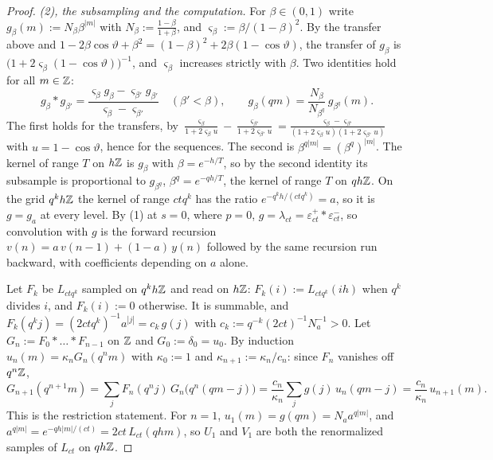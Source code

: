 \begin{proof}
\emph{(2), the subsampling and the computation.} For $\beta \in (0,1)$ write
$g_\beta(m) := N_\beta\beta^{|m|}$ with $N_\beta := \tfrac{1-\beta}{1+\beta}$, and
$\varsigma_\beta := \beta/(1-\beta)^2$. By the transfer above and
$1 - 2\beta\cos\vartheta + \beta^2 = (1-\beta)^2 + 2\beta(1 - \cos\vartheta)$, the transfer of
$g_\beta$ is $\bigl(1 + 2\varsigma_\beta(1 - \cos\vartheta)\bigr)^{-1}$, and $\varsigma_\beta$
increases strictly with $\beta$. Two identities hold for all $m \in \mathbb{Z}$:
\[
  g_\beta * g_{\beta'} = \frac{\varsigma_\beta g_\beta - \varsigma_{\beta'}g_{\beta'}}
  {\varsigma_\beta - \varsigma_{\beta'}} \quad (\beta' < \beta), \qquad
  g_\beta(qm) = \frac{N_\beta}{N_{\beta^q}}\,g_{\beta^q}(m) .
\]
The first holds for the transfers, by
$\frac{\varsigma_\beta}{1 + 2\varsigma_\beta u} - \frac{\varsigma_{\beta'}}{1 + 2\varsigma_{\beta'}u}
= \frac{\varsigma_\beta - \varsigma_{\beta'}}{(1 + 2\varsigma_\beta u)(1 + 2\varsigma_{\beta'}u)}$
with $u = 1 - \cos\vartheta$, hence for the sequences. The second is
$\beta^{q|m|} = (\beta^q)^{|m|}$. The kernel of range $T$ on $h\mathbb{Z}$ is $g_\beta$ with
$\beta = e^{-h/T}$, so by the second identity its subsample is proportional to
$g_{\beta^q}$, $\beta^q = e^{-qh/T}$, the kernel of range $T$ on $qh\mathbb{Z}$. On the grid $q^kh\mathbb{Z}$ the
kernel of range $ctq^k$ has the ratio $e^{-q^kh/(ctq^k)} = a$, so it is $g = g_a$ at every level.
By (1) at $s = 0$, where $p = 0$, $g = \lambda_{ct} = \varepsilon^+_{ct} * \varepsilon^-_{ct}$, so
convolution with $g$ is the forward recursion $v(n) = a\,v(n-1) + (1 - a)\,y(n)$ followed by the
same recursion run backward, with coefficients depending on $a$ alone.

Let $F_k$ be $L_{ctq^k}$ sampled on $q^kh\mathbb{Z}$ and read on $h\mathbb{Z}$: $F_k(i) := L_{ctq^k}(ih)$ when
$q^k$ divides $i$, and $F_k(i) := 0$ otherwise. It is summable, and
$F_k(q^kj) = (2ctq^k)^{-1}a^{|j|} = c_k\,g(j)$ with $c_k := q^{-k}(2ct)^{-1}N_a^{-1} > 0$. Let
$G_n := F_0 * \dots * F_{n-1}$ on $\mathbb{Z}$ and $G_0 := \delta_0 = u_0$. By induction
$u_n(m) = \kappa_nG_n(q^nm)$ with $\kappa_0 := 1$ and $\kappa_{n+1} := \kappa_n/c_n$: since $F_n$
vanishes off $q^n\mathbb{Z}$,
\[
  G_{n+1}(q^{n+1}m) = \sum_jF_n(q^nj)\,G_n\bigl(q^n(qm - j)\bigr)
  = \frac{c_n}{\kappa_n}\sum_jg(j)\,u_n(qm - j) = \frac{c_n}{\kappa_n}\,u_{n+1}(m) .
\]
This is the restriction statement. For $n = 1$, $u_1(m) = g(qm) = N_aa^{q|m|}$, and
$a^{q|m|} = e^{-qh|m|/(ct)} = 2ct\,L_{ct}(qhm)$, so $U_1$ and $V_1$ are both the renormalized
samples of $L_{ct}$ on $qh\mathbb{Z}$.


\end{proof}
